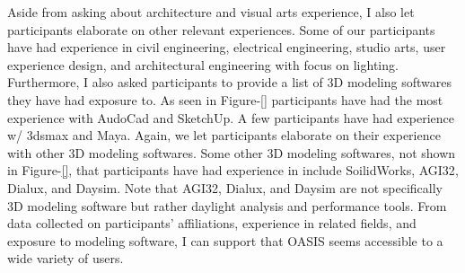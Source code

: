 Aside from asking about architecture and visual arts experience, I also let participants elaborate on other relevant experiences.
Some of our participants have had experience in civil engineering, electrical engineering, studio arts, user experience design, and architectural engineering with focus on lighting.
Furthermore, I also asked participants to provide a list of 3D modeling softwares they have had exposure to.
As seen in Figure-\ref{} participants have had the most experience with AudoCad\cite{} and SketchUp{}. 
A few participants have had experience w/ 3dsmax\cite{} and Maya\cite{}.
Again, we let participants elaborate on their experience with other 3D modeling softwares. 
Some other 3D modeling softwares, not shown in Figure-\ref{}, that participants have had experience in include SoilidWorks\cite{}, AGI32\cite{}, Dialux\cite{}, and Daysim\cite{}.
Note that AGI32, Dialux, and Daysim are not specifically 3D modeling software but rather daylight analysis and performance tools.
From data collected on participants' affiliations, experience in related fields, and exposure to modeling software, I can support that OASIS seems accessible to a wide variety of users.

